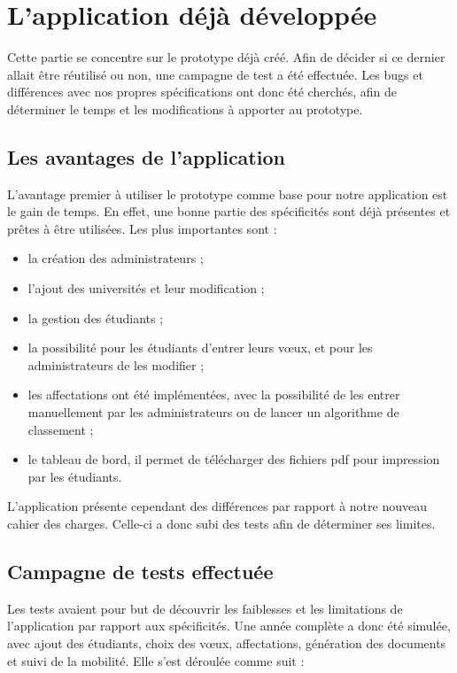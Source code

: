 \section{L'application déjà développée}

Cette partie se concentre sur le prototype déjà créé. Afin de décider si ce dernier allait être réutilisé ou non, une campagne de test a été effectuée. Les bugs et différences avec nos propres spécifications ont donc été cherchés, afin de déterminer le temps et les modifications à apporter au prototype.


\subsection{Les avantages de l'application}

L'avantage premier à utiliser le prototype comme base pour notre application est le gain de temps. En effet, une bonne partie des spécificités sont déjà présentes et prêtes à être utilisées.
Les plus importantes sont :
\begin{itemize}
\item la création des administrateurs ;
\item l'ajout des universités et leur modification ;
\item la gestion des étudiants ;
\item la possibilité pour les étudiants d'entrer leurs vœux, et pour les administrateurs de les modifier ;
\item les affectations ont été implémentées, avec la possibilité de les entrer manuellement par les administrateurs ou de lancer un algorithme de classement ;
\item le tableau de bord, il permet de télécharger des fichiers pdf pour impression par les étudiants.
\end{itemize}

L'application présente cependant des différences par rapport à notre nouveau cahier des charges. Celle-ci a donc subi des tests afin de déterminer ses limites.


\subsection{Campagne de tests effectuée}

Les tests avaient pour but de découvrir les faiblesses et les limitations de l'application par rapport aux spécificités. Une année complète a donc été simulée, avec ajout des étudiants, choix des vœux, affectations, génération des documents et suivi de la mobilité.
Elle s'est déroulée comme suit :

